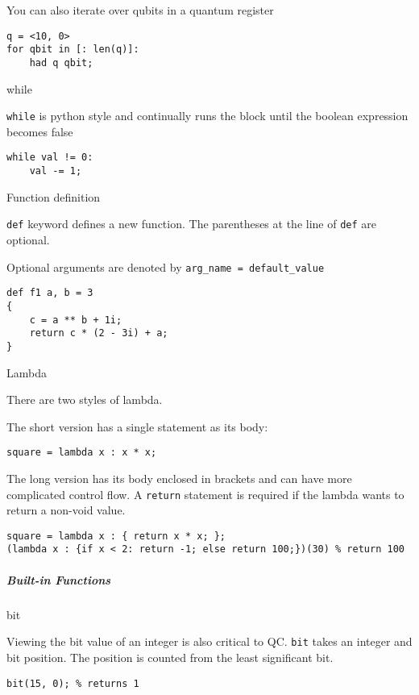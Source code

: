 \documentclass[]{article}
\begin{document}
You can also iterate over qubits in a quantum register

\begin{verbatim}
q = <10, 0>
for qbit in [: len(q)]:
    had q qbit;
\end{verbatim}

while

\texttt{while} is python style and continually runs the block until the
boolean expression becomes false

\begin{verbatim}
while val != 0:
    val -= 1;
\end{verbatim}

Function definition

\texttt{def} keyword defines a new function. The parentheses at the line
of \texttt{def} are optional.

Optional arguments are denoted by \texttt{arg\_name = default\_value}

\begin{verbatim}
def f1 a, b = 3
{
    c = a ** b + 1i;
    return c * (2 - 3i) + a;
}
\end{verbatim}

Lambda

There are two styles of lambda.

The short version has a single statement as its body:

\begin{verbatim}
square = lambda x : x * x;
\end{verbatim}

The long version has its body enclosed in brackets and can have more
complicated control flow. A \texttt{return} statement is required if the
lambda wants to return a non-void value.

\begin{verbatim}
square = lambda x : { return x * x; };
(lambda x : {if x < 2: return -1; else return 100;})(30) % return 100
\end{verbatim}

\subparagraph{Built-in Functions}\label{built-in-functions}

bit

Viewing the bit value of an integer is also critical to QC. \texttt{bit}
takes an integer and bit position. The position is counted from the
least significant bit.

\begin{verbatim}
bit(15, 0); % returns 1
\end{verbatim}
\end{document}
